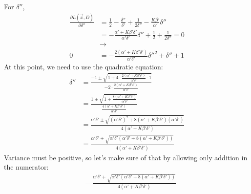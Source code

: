 \documentclass[12pt]{article}
\begin{document}
\begin{appendices}
For $\delta''$,
\begin{align}
    \frac{\partial L(\vec{x}, D)}{\partial \delta''} &=
    \frac{1}{2} - \frac{\delta''}{\delta'}
    + \frac{1}{2\delta''} - \frac{K\beta'}{\alpha'}\delta''
    \nonumber \\
    &= -\frac{\alpha' + K\beta'\delta'}{\alpha'\delta'}\delta'' + \frac{1}{2}
    + \frac{1}{2\delta''} = 0
    \nonumber \\
    & \rightarrow
    \nonumber \\
    0 &= -\frac{2(\alpha' + K\beta'\delta')}{\alpha'\delta'}\delta''^2
    + \delta''
    + 1
    \nonumber
\end{align}
At this point, we need to use the quadratic equation:
\begin{align}
    \delta'' &= \frac{-1 \pm
    \sqrt{1 + 4\cdot\frac{2(\alpha' + K\beta'\delta')}{\alpha'\delta'}
    \cdot 1}}
    {-2\cdot\frac{2(\alpha' + K\beta'\delta')}{\alpha'\delta'}}
    \nonumber \\
    &= \frac{1 \pm
    \sqrt{1 + \frac{8(\alpha' + K\beta'\delta')}{\alpha'\delta'}}}
    {\frac{4(\alpha' + K\beta'\delta')}{\alpha'\delta'}}
    \nonumber \\
    &= \frac{\alpha'\delta' \pm
    \sqrt{(\alpha'\delta')^2 + 8(\alpha' + K\beta'\delta')(\alpha'\delta')}}
    {4(\alpha' + K\beta'\delta')}
    \nonumber \\
    &= \frac{\alpha'\delta' \pm
    \sqrt{\alpha'\delta'(\alpha'\delta' + 8(\alpha' + K\beta'\delta'))}}
    {4(\alpha' + K\beta'\delta')}
    \nonumber
\end{align}
Variance must be positive, so let's make sure of that by allowing only addition
in the numerator:
\begin{align}
    &= \frac{\alpha'\delta' +
    \sqrt{\alpha'\delta'(\alpha'\delta' + 8(\alpha' + K\beta'\delta'))}}
    {4(\alpha' + K\beta'\delta')}
\end{align}


\end{appendices}
\end{document}
